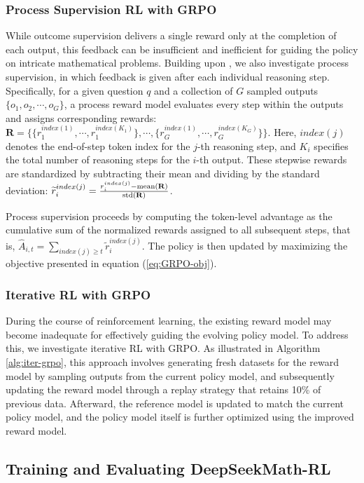 \begin{itemize}[topsep=0pt]
\begin{itemize}[topsep=0pt]
\subsubsection{Process Supervision RL with GRPO} While outcome supervision delivers a single reward only at the completion of each output, this feedback can be insufficient and inefficient for guiding the policy on intricate mathematical problems. Building upon \cite{wang2023math}, we also investigate process supervision, in which feedback is given after each individual reasoning step. Specifically, for a given question $q$ and a collection of $G$ sampled outputs $\{o_1, o_2, \cdots, o_G\}$, a process reward model evaluates every step within the outputs and assigns corresponding rewards: $\mathbf{R} = \{ \{r_1^{index(1)},\cdots,r_1^{index(K_1)}\}, \cdots,  \{r_G^{index(1)},\cdots,r_G^{index(K_G)}\} \}$. Here, $index(j)$ denotes the end-of-step token index for the $j$-th reasoning step, and $K_i$ specifies the total number of reasoning steps for the $i$-th output. These stepwise rewards are standardized by subtracting their mean and dividing by the standard deviation: $\widetilde{r}_i^{index(j)} = \frac{r_i^{index(j)} - {\rm mean(\mathbf{R})}}{{\rm std(\mathbf{R})}}$.

Process supervision proceeds by computing the token-level advantage as the cumulative sum of the normalized rewards assigned to all subsequent steps, that is, $\hat{A}_{i, t} = \sum_{index(j) \ge t} \widetilde{r}_i^{index(j)}$. The policy is then updated by maximizing the objective presented in equation (\ref{eq:GRPO-obj}).

\subsubsection{Iterative RL with GRPO} During the course of reinforcement learning, the existing reward model may become inadequate for effectively guiding the evolving policy model. To address this, we investigate iterative RL with GRPO. As illustrated in Algorithm \ref{alg:iter-grpo}, this approach involves generating fresh datasets for the reward model by sampling outputs from the current policy model, and subsequently updating the reward model through a replay strategy that retains 10\% of previous data. Afterward, the reference model is updated to match the current policy model, and the policy model itself is further optimized using the improved reward model.

\subsection{Training and Evaluating DeepSeekMath-RL}


\end{itemize}
\end{itemize}
